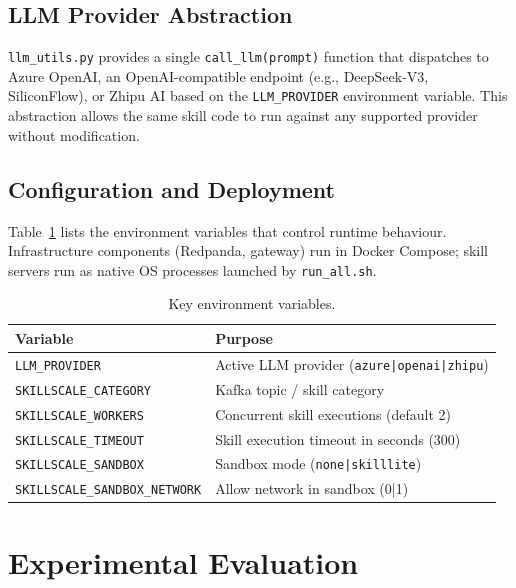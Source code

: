 \documentclass[sigconf,nonacm]{acmart}
\begin{document}
\subsection{LLM Provider Abstraction}

\texttt{llm\_utils.py} provides a single \texttt{call\_llm(prompt)} function that dispatches to Azure OpenAI, an OpenAI-compatible endpoint (e.g., DeepSeek-V3, SiliconFlow), or Zhipu AI based on the \texttt{LLM\_PROVIDER} environment variable. This abstraction allows the same skill code to run against any supported provider without modification.

\subsection{Configuration and Deployment}

Table~\ref{tab:config} lists the environment variables that control runtime behaviour. Infrastructure components (Redpanda, gateway) run in Docker Compose; skill servers run as native OS processes launched by \texttt{run\_all.sh}.

\begin{table}[h]
\centering
\caption{Key environment variables.}
\label{tab:config}
\begin{tabular}{ll}
\toprule
\textbf{Variable} & \textbf{Purpose} \\
\midrule
\texttt{LLM\_PROVIDER} & Active LLM provider (\texttt{azure|openai|zhipu}) \\
\texttt{SKILLSCALE\_CATEGORY} & Kafka topic / skill category \\
\texttt{SKILLSCALE\_WORKERS} & Concurrent skill executions (default 2) \\
\texttt{SKILLSCALE\_TIMEOUT} & Skill execution timeout in seconds (300) \\
\texttt{SKILLSCALE\_SANDBOX} & Sandbox mode (\texttt{none|skilllite}) \\
\texttt{SKILLSCALE\_SANDBOX\_NETWORK} & Allow network in sandbox (0|1) \\
\bottomrule
\end{tabular}
\end{table}

\section{Experimental Evaluation}
\label{sec:eval}
\end{document}
